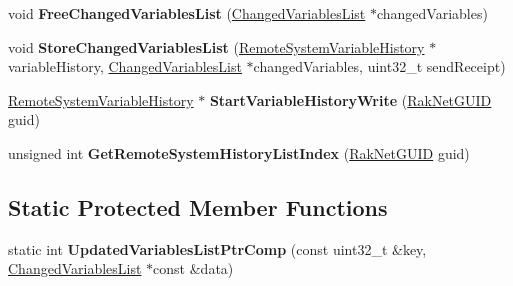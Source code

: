 \begin{DoxyCompactItemize}
\item 
\hypertarget{class_rak_net_1_1_variable_delta_serializer_ae193aa8eb65b49ce18996132482cd968}{void {\bfseries Free\-Changed\-Variables\-List} (\hyperlink{struct_rak_net_1_1_variable_delta_serializer_1_1_changed_variables_list}{Changed\-Variables\-List} $\ast$changed\-Variables)}\label{class_rak_net_1_1_variable_delta_serializer_ae193aa8eb65b49ce18996132482cd968}

\item 
\hypertarget{class_rak_net_1_1_variable_delta_serializer_a582eca95bd0774710993fd5e8abc1ee4}{void {\bfseries Store\-Changed\-Variables\-List} (\hyperlink{struct_rak_net_1_1_variable_delta_serializer_1_1_remote_system_variable_history}{Remote\-System\-Variable\-History} $\ast$variable\-History, \hyperlink{struct_rak_net_1_1_variable_delta_serializer_1_1_changed_variables_list}{Changed\-Variables\-List} $\ast$changed\-Variables, uint32\-\_\-t send\-Receipt)}\label{class_rak_net_1_1_variable_delta_serializer_a582eca95bd0774710993fd5e8abc1ee4}

\item 
\hypertarget{class_rak_net_1_1_variable_delta_serializer_a0d6e15b545949488357118cdea055a6a}{\hyperlink{struct_rak_net_1_1_variable_delta_serializer_1_1_remote_system_variable_history}{Remote\-System\-Variable\-History} $\ast$ {\bfseries Start\-Variable\-History\-Write} (\hyperlink{struct_rak_net_1_1_rak_net_g_u_i_d}{Rak\-Net\-G\-U\-I\-D} guid)}\label{class_rak_net_1_1_variable_delta_serializer_a0d6e15b545949488357118cdea055a6a}

\item 
\hypertarget{class_rak_net_1_1_variable_delta_serializer_a23862292bd18270b03526fce96842670}{unsigned int {\bfseries Get\-Remote\-System\-History\-List\-Index} (\hyperlink{struct_rak_net_1_1_rak_net_g_u_i_d}{Rak\-Net\-G\-U\-I\-D} guid)}\label{class_rak_net_1_1_variable_delta_serializer_a23862292bd18270b03526fce96842670}

\end{DoxyCompactItemize}
\subsection*{Static Protected Member Functions}
\begin{DoxyCompactItemize}
\item 
\hypertarget{class_rak_net_1_1_variable_delta_serializer_aec1594cced3f552478f4b6a1e053979f}{static int {\bfseries Updated\-Variables\-List\-Ptr\-Comp} (const uint32\-\_\-t \&key, \hyperlink{struct_rak_net_1_1_variable_delta_serializer_1_1_changed_variables_list}{Changed\-Variables\-List} $\ast$const \&data)}\label{class_rak_net_1_1_variable_delta_serializer_aec1594cced3f552478f4b6a1e053979f}

\end{DoxyCompactItemize}
